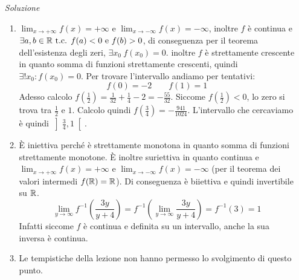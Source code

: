 \documentclass{article}
\begin{document}
\begin{enumerate}[label=\textbf{Esercizio 6.\arabic*.},itemindent=*]
\begin{enumerate}
\end{enumerate}
\item[\textit{\large Soluzione~}]~ 
    \begin{enumerate}
        \item $\lim_{x\to+\infty}f(x)=+\infty$ e $\lim_{x\to-\infty}f(x)=-\infty$, inoltre $f$ è continua e $\exists a,b\in \mathbb{R} \text{ t.c. } f(a)<0 ~ \text{e}~f(b)>0$, di conseguenza per il teorema dell'esistenza degli zeri, $\exists x_0\:f(x_0)=0$. inoltre $f$ è strettamente crescente in quanto somma di funzioni strettamente crescenti, quindi $\exists!x_0:f(x_0)=0$. Per trovare l'intervallo andiamo per tentativi:
        \[f(0)=-2~~~~~~~~~f(1)=1\]
        Adesso calcolo $f\left( \frac{1}{2} \right)=\frac{1}{32}+\frac{1}{4}-2=-\frac{55}{32}$. Siccome $f\left( \frac{1}{2} \right)<0$, lo zero si trova tra $\frac{1}{2}$ e $1$. Calcolo quindi $f\left( \frac{3}{4} \right)=-\frac{941}{1024}$. L'intervallo che cercaviamo è quindi $\left]\frac{3}{4},1 \right[$.
        \item È iniettiva perché è strettamente monotona in quanto somma di funzioni strettamente monotone. È inoltre suriettiva in quanto continua e $\lim_{x\to+\infty}f(x)=+\infty$ e $\lim_{x\to-\infty}f(x)=-\infty$ (per il teorema dei valori intermedi $f(\mathbb{R})=\mathbb{R}$). Di conseguenza è biiettiva e quindi invertibile su $\mathbb{R}$.
        \[\lim_{y\to \infty}f^{-1}\left( \frac{3y}{y+4} \right)=f^{-1}\left( \lim_{y\to \infty}\frac{3y}{y+4} \right)=f^{-1}(3)=1\]
        Infatti siccome $f$ è continua e definita su un intervallo, anche la sua inversa è continua.
        \item Le tempistiche della lezione non hanno permesso lo svolgimento di questo punto.
        
    \end{enumerate}
    

\end{enumerate}
\end{document}
